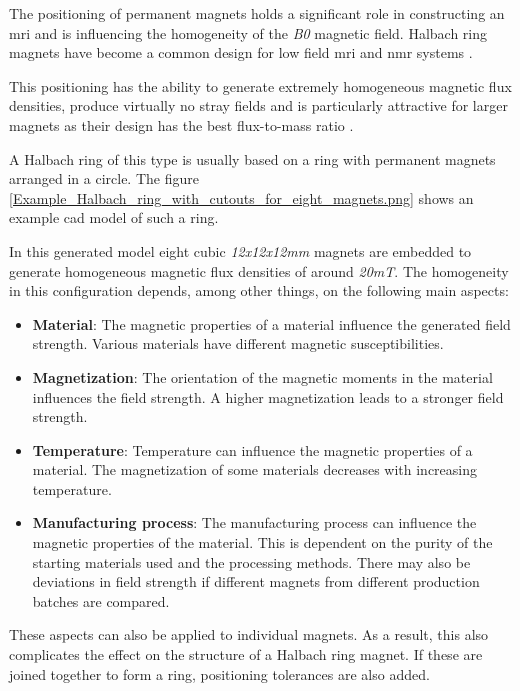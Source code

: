 The positioning of permanent magnets holds a significant role in
constructing an \gls{mri} and is influencing the homogeneity of the
\emph{B0} magnetic field. Halbach ring magnets  have
become a common design for low field \gls{mri} and \gls{nmr} systems
.

This positioning has the ability to generate extremely homogeneous
magnetic flux densities, produce virtually no stray fields and is
particularly attractive for larger magnets as their design has the best
flux-to-mass ratio .

A Halbach ring of this type is usually based on a ring with permanent
magnets arranged in a circle. The figure
\ref{Example_Halbach_ring_with_cutouts_for_eight_magnets.png} shows an
example \gls{cad} model of such a ring.

\newpage

In this generated model eight cubic \emph{12x12x12mm} magnets are
embedded to generate homogeneous magnetic flux densities of around
\emph{20mT}. The homogeneity in this configuration depends, among other
things, on the following main aspects:

\begin{itemize}
\item
  \textbf{Material}: The magnetic properties of a material influence the
  generated field strength. Various materials have different magnetic
  susceptibilities.
\item
  \textbf{Magnetization}: The orientation of the magnetic moments in the
  material influences the field strength. A higher magnetization leads
  to a stronger field strength.
\item
  \textbf{Temperature}: Temperature can influence the magnetic
  properties of a material. The magnetization of some materials
  decreases with increasing temperature.
\item
  \textbf{Manufacturing process}: The manufacturing process can
  influence the magnetic properties of the material. This is dependent
  on the purity of the starting materials used and the processing
  methods. There may also be deviations in field strength if different
  magnets from different production batches are compared.
\end{itemize}

These aspects can also be applied to individual magnets. As a result,
this also complicates the effect on the structure of a Halbach ring
magnet. If these are joined together to form a ring, positioning
tolerances are also added.

